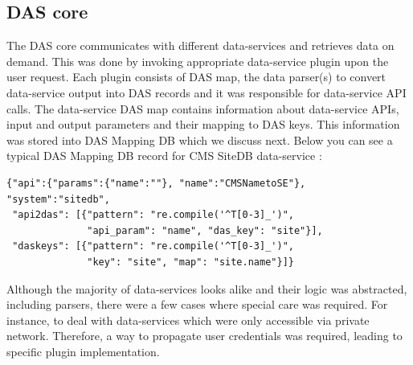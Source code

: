 \documentclass[1p,times]{elsarticle}
\begin{document}
\subsection{DAS core}
The DAS core communicates with different data-services and retrieves
data on demand. This was done by invoking appropriate data-service plugin
upon the user request. Each plugin consists of DAS map, the
data parser(s) to convert data-service output into DAS records
and it was responsible for data-service API calls.
The data-service DAS map contains information about data-service APIs,
input and output parameters and their mapping to DAS keys. 
This information was stored into DAS Mapping DB which we discuss next.
Below you can see a typical DAS Mapping DB record for CMS
SiteDB data-service \cite{SiteDB}:
\begin{verbatim}
{"api":{"params":{"name":""}, "name":"CMSNametoSE"}, "system":"sitedb",
 "api2das": [{"pattern": "re.compile('^T[0-3]_')", 
              "api_param": "name", "das_key": "site"}], 
 "daskeys": [{"pattern": "re.compile('^T[0-3]_')", 
              "key": "site", "map": "site.name"}]}
\end{verbatim}
Although the majority of data-services looks alike
and their logic was abstracted, including parsers, there were a few
cases where special care was required. For instance,
to deal with data-services which were only accessible via private network.
Therefore, a way to propagate user credentials was required, leading
to specific plugin implementation.

\end{document}
